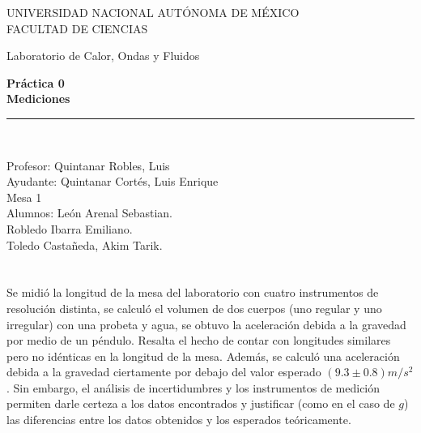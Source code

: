 \documentclass{article}
\begin{document}
\begin{titlepage}
\begin{center}
\begin{figure}
\end{figure}
\vspace*{0.5in}
UNIVERSIDAD NACIONAL AUTÓNOMA DE MÉXICO\\
\vspace*{0.2in}
FACULTAD DE CIENCIAS \\
\vspace*{0.5in}
\begin{large}
Laboratorio de Calor, Ondas y Fluidos\\
\end{large}
\vspace*{0.2in}
\begin{Large}
\textbf{Práctica 0} \\
\textbf{Mediciones} \\
\end{Large}
\vspace*{0.3in}
\vspace*{0.3in}
\rule{80mm}{0.1mm}\\
\vspace*{0.1in}
\begin{large}
Profesor:  Quintanar Robles, Luis  \\
Ayudante: Quintanar Cortés, Luis Enrique \\
Mesa 1\\
Alumnos: León Arenal Sebastian.\\
Robledo Ibarra Emiliano. \\
Toledo Castañeda, Akim Tarik.\\

\end{large}
\end{center}
\end{titlepage}


\section*{}
    Se midió la  longitud de la mesa del laboratorio con cuatro instrumentos de resolución distinta, se calculó el volumen de dos cuerpos (uno regular y uno irregular) con una probeta y agua, se obtuvo la aceleración debida a la gravedad por medio de un péndulo. Resalta el hecho de contar con longitudes similares pero no idénticas en la longitud de la mesa. Además, se calculó una aceleración debida a la gravedad ciertamente por debajo del valor esperado $(9.3\pm0.8)m/s^2$. Sin embargo, el análisis de incertidumbres y los instrumentos de medición permiten darle certeza a los datos encontrados y justificar (como en el caso de $g$) las diferencias entre los datos obtenidos y los esperados teóricamente.
\end{document}

